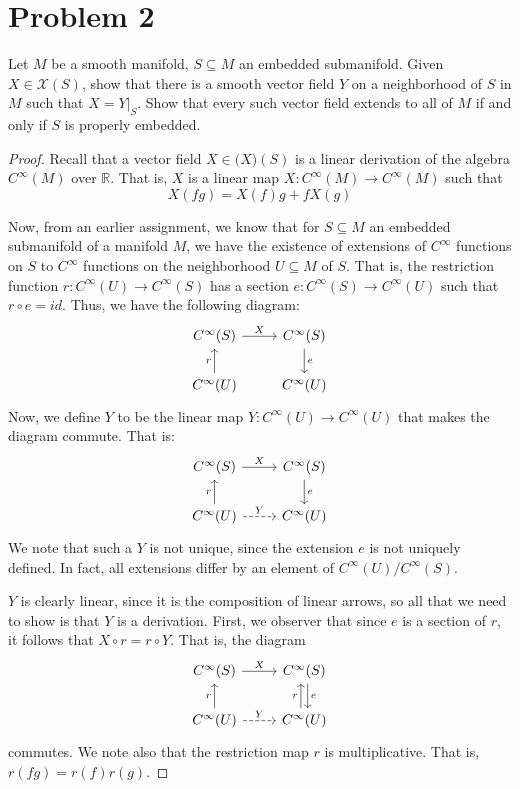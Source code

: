 \documentclass[fontsize=11pt]{scrartcl} %
\numberwithin{equation}{section} %
\numberwithin{figure}{section} %
\numberwithin{table}{section} %
\newcommand{\R}{\mathbb{R}}
\begin{document}
\section*{Problem 2} %
Let $M$ be a smooth manifold, $S\subseteq M$ an embedded submanifold. Given
$X\in\mathcal{X}(S)$, show that there is a smooth vector field $Y$ on a
neighborhood of $S$ in $M$ such that $X=Y|_S$. Show that every such vector field
extends to all of $M$ if and only if $S$ is properly embedded.
\\
\begin{proof}
    Recall that a vector field $X\in\mathcal(X)(S)$ is a linear derivation of
    the algebra $C^{\infty}(M)$ over $\R$. That is, $X$ is a linear map
    $X:C^{\infty}(M)\to C^{\infty}(M)$ such that
    \[
        X(fg) = X(f)g + fX(g)
    \]

    Now, from an earlier assignment, we know that for $S\subseteq M$ an embedded
    submanifold of a manifold $M$, we have the existence of extensions of
    $C^{\infty}$ functions on $S$ to $C^{\infty}$ functions on the neighborhood
    $U\subseteq M$ of $S$. That is, the restriction function $r:C^{\infty}(U)\to
    C^{\infty}(S)$ has a section $e:C^{\infty}(S)\to C^{\infty}(U)$ such that
    $r\circ e = id$. Thus, we have the following diagram:
    \[
        \begin{tikzcd}
            C^{\infty}(S)\arrow{r}{X} &C^{\infty}(S)\arrow{d}{e}\\
            C^{\infty}(U)\arrow{u}{r} &C^{\infty}(U)
        \end{tikzcd}
    \]
    Now, we define $Y$ to be the linear map $Y:C^{\infty}(U)\to C^{\infty}(U)$
    that makes the diagram commute. That is:
    \[
        \begin{tikzcd}
            C^{\infty}(S)\arrow{r}{X} &C^{\infty}(S)\arrow{d}{e}\\
            C^{\infty}(U)\arrow{u}{r}\arrow[dashed]{r}{Y} &C^{\infty}(U)
        \end{tikzcd}
    \]
    We note that such a $Y$ is not unique, since the extension $e$ is not
    uniquely defined. In fact, all extensions differ by an element of
    $C^{\infty}(U)/{C^{\infty}(S)}$.

    $Y$ is clearly linear, since it is the composition of linear arrows, so all
    that we need to show is that $Y$ is a derivation. First, we observer that
    since $e$ is a section of $r$, it follows that $X\circ r = r\circ Y$. That
    is, the diagram
    \[
        \begin{tikzcd}
            C^{\infty}(S)\arrow{r}{X} &C^{\infty}(S)\arrow[shift left]{d}{e}\\
            C^{\infty}(U)\arrow{u}{r}\arrow[dashed]{r}{Y}
            &C^{\infty}(U)\arrow[shift left]{u}{r}
        \end{tikzcd}
    \]
    commutes. We note also that the restriction map $r$ is multiplicative. That
    is, $r(fg) = r(f)r(g)$. 


\end{proof}
\end{document}
